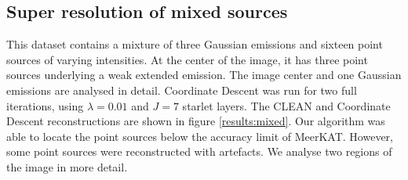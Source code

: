 
\subsection{Super resolution of mixed sources}
This dataset contains a mixture of three Gaussian emissions and sixteen point sources of varying intensities. At the center of the image, it has three point sources underlying a weak extended emission. The image center and one Gaussian emissions are analysed in detail. Coordinate Descent was run for two full iterations, using  $\lambda=0.01$ and $J=7$ starlet layers. The CLEAN and Coordinate Descent reconstructions are shown in figure \ref{results:mixed}. Our algorithm was able to locate the point sources below the accuracy limit of MeerKAT. However, some point sources were reconstructed with artefacts. We analyse two regions of the image in more detail.

